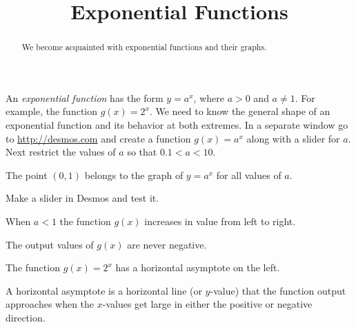 \documentclass{ximera}
\title{Exponential Functions}
\begin{document}
\begin{abstract}
We become acquainted with exponential functions and their graphs.
\end{abstract}
\maketitle


An \emph{exponential function} has the form $y=a^x$, where $a>0$ and $a\ne1$. For example, the function $g(x)=2^x$. We need to know the general shape of an exponential function and its behavior at both extremes. In a separate window go to \href{http://desmos.com}{http://desmos.com} and create a function $g(x)=a^x$ along with a slider for $a$. Next restrict the values of $a$ so that $0.1<a<10$.

\begin{question}
The point $(0,1)$ belongs to the graph of $y=a^x$ for all values of $a$.
\begin{hint}
Make a slider in Desmos and test it.
\end{hint}
    \begin{multipleChoice}
    \end{multipleChoice}
\end{question}

\begin{question}
When $a<1$ the function $g(x)$ increases in value from left to right.
    \begin{multipleChoice}
    \end{multipleChoice}
\end{question}

\begin{question}
The output values of $g(x)$ are never negative.
    \begin{multipleChoice}
    \end{multipleChoice}
\end{question}

\begin{question}
The function $g(x)=2^x$ has a horizontal asymptote on the left.
\begin{hint}
A horizontal asymptote is a horizontal line (or $y$-value) that the function output approaches when the $x$-values get large in either the positive or negative direction.
\end{hint}
    \begin{multipleChoice}
    \end{multipleChoice}
\end{question}
\end{document}
